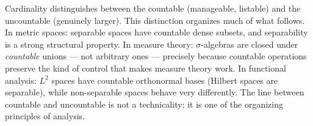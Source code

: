 \begin{remark*}[Transition]
Cardinality distinguishes between the countable (manageable, listable) and the
uncountable (genuinely larger). This distinction organizes much of what
follows. In metric spaces: separable spaces have countable dense subsets, and
separability is a strong structural property. In measure theory: $\sigma$-algebras
are closed under \emph{countable} unions --- not arbitrary ones --- precisely because
countable operations preserve the kind of control that makes measure theory work.
In functional analysis: $L^2$ spaces have countable orthonormal bases
(Hilbert spaces are separable), while non-separable spaces behave very
differently. The line between countable and uncountable is not a technicality;
it is one of the organizing principles of analysis.
\end{remark*}
